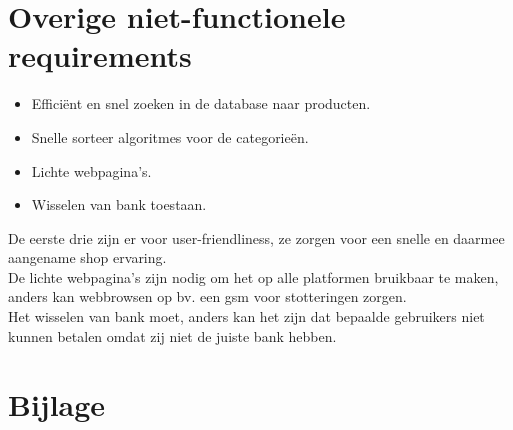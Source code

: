 \documentclass[•]{article}
\begin{document}
\section{Overige niet-functionele requirements}
\begin{itemize}
\item Effici\"ent en snel zoeken in de database naar producten.
\item Snelle sorteer algoritmes voor de categorie\"en.
\item Lichte webpagina's.
\item Wisselen van bank toestaan.
\end{itemize}
De eerste drie zijn er voor user-friendliness, ze zorgen voor een snelle en daarmee aangename shop ervaring.\\
De lichte webpagina's zijn nodig om het op alle platformen bruikbaar te maken, anders kan webbrowsen op bv. een gsm voor stotteringen zorgen.\\
Het wisselen van bank moet, anders kan het zijn dat bepaalde gebruikers niet kunnen betalen omdat zij niet de juiste bank hebben.
\newpage

\newpage

\section{Bijlage}
\end{document}
